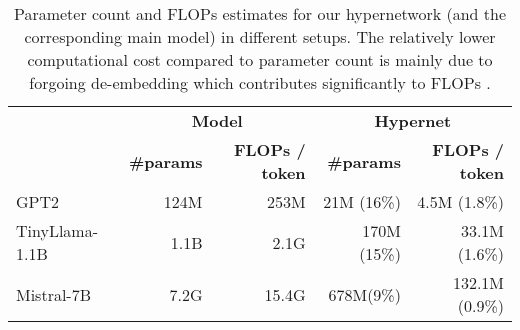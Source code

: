 \begin{table}[!t]
\caption{Parameter count and FLOPs estimates for our hypernetwork (and the corresponding main model) in different setups. The relatively lower computational cost compared to parameter count is mainly due to forgoing de-embedding which contributes significantly to FLOPs \citep{kaplan2020scaling}.}
\centering
\small
\setlength\tabcolsep{3pt}
\begin{tabular}{lrr@{\hskip 0.1in}rr}
\toprule
& \multicolumn{2}{c}{\textbf{Model}} & \multicolumn{2}{c}{\textbf{Hypernet}} \\ 
& \textbf{\#params} & \textbf{FLOPs / token} & \textbf{\#params} & \textbf{FLOPs / token} \\
\midrule
GPT2 & 124M & 253M & 21M (16\%) & 4.5M (1.8\%)\\
TinyLlama-1.1B & 1.1B & 2.1G & 170M (15\%) & 33.1M (1.6\%)\\
Mistral-7B & 7.2G & 15.4G & 678M\:\:\;(9\%) & 132.1M (0.9\%)\\
\bottomrule
\end{tabular}
\label{table:flops}
\end{table}